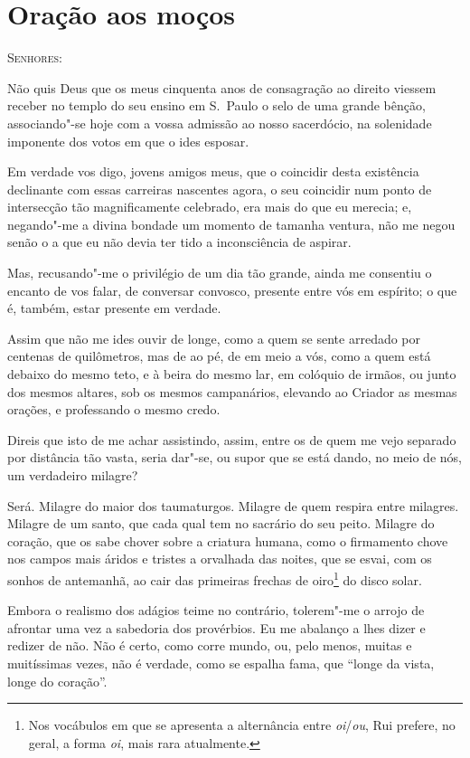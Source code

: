\chapter*{Oração aos moços}

\textsc{Senhores:}

\begingroup
\linenumbers

Não quis Deus que os meus cinquenta anos de consagração ao direito
viessem receber no templo do seu ensino
em S.~Paulo o selo de uma grande bênção, associando"-se hoje com a 
vossa admissão ao nosso sacerdócio, na solenidade imponente dos votos em que o ides esposar.

Em verdade vos digo, jovens amigos meus, que o coincidir desta
existência declinante com essas carreiras nascentes agora, o seu
coincidir num ponto de intersecção tão magnificamente celebrado, era
mais do que eu merecia; e, negando"-me a divina bondade um momento de
tamanha ventura, não me negou senão o a que eu não devia ter tido a
inconsciência de aspirar.

Mas, recusando"-me o privilégio de um dia tão grande, ainda me
consentiu o encanto de vos falar, de conversar convosco, presente entre
vós em espírito; o que é, também, estar presente em verdade.

Assim que não me ides ouvir de longe, como a quem se sente
arredado por centenas de quilômetros, mas de ao pé, de em meio a vós,
como a quem está debaixo do mesmo teto, e à beira do mesmo lar, em
colóquio de irmãos, ou junto dos mesmos altares, sob os mesmos
campanários, elevando ao Criador as mesmas orações, e professando o
mesmo credo.

Direis que isto de me achar assistindo, assim, entre os de quem me
vejo separado por distância tão vasta, seria dar"-se, ou supor que se
está dando, no meio de nós, um verdadeiro milagre?

Será. Milagre do maior dos taumaturgos. Milagre de quem respira
entre milagres. Milagre de um santo, que cada qual tem no sacrário do
seu peito. Milagre do coração, que os sabe chover sobre a criatura
humana, como o firmamento chove nos campos mais áridos e tristes a
orvalhada das noites, que se esvai, com os sonhos de antemanhã, ao cair
das primeiras frechas de oiro\footnote{Nos vocábulos em que se apresenta a
alternância entre \textit{oi}/\textit{ou}, Rui
prefere, no geral, a forma \textit{oi}, mais rara atualmente.} do disco solar.


Embora o realismo dos adágios teime no contrário, tolerem"-me o
arrojo de afrontar uma vez a sabedoria dos provérbios. Eu me abalanço a
lhes dizer e redizer de não. Não é certo, como corre mundo, ou, pelo
menos, muitas e muitíssimas vezes, não é verdade, como se espalha fama,
que ``longe da vista, longe do coração''.

